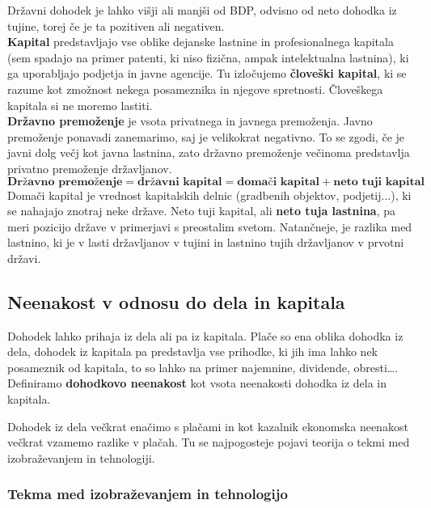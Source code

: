 \documentclass[a4paper,12 pt]{article}
\begin{document}
Državni dohodek je lahko višji ali manjši od BDP, odvisno od neto dohodka iz tujine, torej če je ta pozitiven ali negativen.
\\

\textbf{Kapital} predstavljajo vse oblike dejanske lastnine in profesionalnega kapitala (sem spadajo na primer patenti, ki niso fizična, ampak intelektualna lastnina), ki ga uporabljajo podjetja in javne agencije. Tu izločujemo \textbf{človeški kapital}, ki se razume kot zmožnost nekega posameznika in njegove spretnosti. Človeškega kapitala si ne moremo lastiti.
\\

\textbf{Državno premoženje} je vsota privatnega in javnega premoženja. Javno premoženje ponavadi zanemarimo, saj je velikokrat negativno. To se zgodi, če je javni dolg večj kot javna lastnina, zato državno premoženje večinoma predstavlja privatno premoženje državljanov.
$$
\textbf{Državno premoženje}=\textbf{državni kapital}=\textbf{domači kapital}+\textbf{neto tuji kapital}
$$
Domači kapital je vrednost kapitalskih delnic (gradbenih objektov, podjetij...), ki se nahajajo znotraj neke države. Neto tuji kapital, ali \textbf{neto tuja lastnina}, pa meri pozicijo države v primerjavi s preostalim svetom. Natančneje, je razlika med lastnino, ki je v lasti državljanov v tujini in lastnino tujih državljanov v prvotni državi.
\newpage

\subsection[Neenakost v odnosu do dela in kapitala]{Neenakost v odnosu do dela in kapitala}

Dohodek lahko prihaja iz dela ali pa iz kapitala. Plače so ena oblika dohodka iz dela, dohodek iz kapitala pa predstavlja vse prihodke, ki jih ima lahko nek posameznik od kapitala, to so lahko na primer najemnine, dividende, obresti\dots. Definiramo \textbf{dohodkovo neenakost} kot vsota neenakosti dohodka iz dela in kapitala.

Dohodek iz dela večkrat enačimo s plačami in kot kazalnik ekonomska neenakost večkrat vzamemo razlike v plačah. Tu se najpogosteje pojavi teorija o tekmi med izobraževanjem in tehnologiji.

\subsubsection[Tekma med izobraževanjem in tehnologijo]{Tekma med izobraževanjem in tehnologijo}
\end{document}

